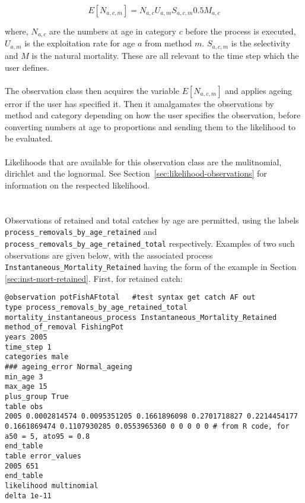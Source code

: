 \begin{itemize}
\begin{equation}
E[N_{a,c,m}] = N_{a,c} U_{a,m} S_{a,c,m} 0.5 M_{a,c}
\end{equation}

where, $N_{a,c}$ are the numbers at age in category $c$ before the process is executed, $U_{a,m}$ is the exploitation rate for age $a$ from method $m$. $S_{a,c,m}$ is the selectivity and $M$ is the natural mortality. These are all relevant to the time step which the user defines.
\\\\
The observation class then acquires the variable $E[N_{a,c,m}]$ and applies ageing error if the user has specified it. Then it amalgamates the observations by method and category depending on how the user specifies the observation, before converting numbers at age to proportions and sending them to the likelihood to be evaluated.
\\\\
Likelihoods that are available for this observation class are the mulitnomial, dirichlet and the lognormal. See Section~\ref{sec:likelihood-observations} for information on the respected likelihood.
\\\\

\paragraph*{\label{sec:removals-by-age-retained}}	
Observations of retained and total catches by age are permitted, using the labels \texttt{process\_removals\_by\_age\_retained} and \texttt{process\_removals\_by\_age\_retained\_total} respectively. Examples of two such observations are given below, with the associated process \texttt{Instantaneous\_Mortality\_Retained} having the form of the example in Section \ref{sec:inst-mort-retained}. First, for retained catch:

{\small{\begin{verbatim}
@observation potFishAFtotal   #test syntax get catch AF out
type process_removals_by_age_retained_total
mortality_instantaneous_process Instantaneous_Mortality_Retained
method_of_removal FishingPot
years 2005
time_step 1
categories male
### ageing_error Normal_ageing
min_age 3
max_age 15
plus_group True
table obs
2005 0.0002814574 0.0095351205 0.1661896098 0.2701718827 0.2214454177 0.1661869474 0.1107930285 0.0553965360 0 0 0 0 0 # from R code, for a50 = 5, ato95 = 0.8
end_table
table error_values
2005 651
end_table
likelihood multinomial
delta 1e-11
\end{verbatim}}}


\end{itemize}
